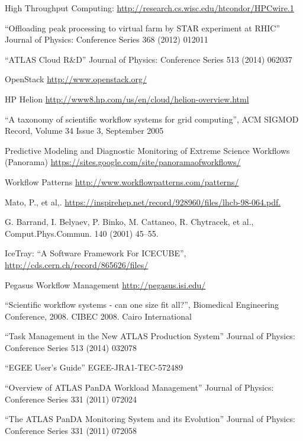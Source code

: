 \begin{thebibliography}{99}
 High Throughput Computing: \url{http://research.cs.wisc.edu/htcondor/HPCwire.1}

 ``Offloading peak processing to virtual farm by STAR experiment at RHIC'' Journal of Physics: Conference Series 368 (2012) 012011

 ``ATLAS Cloud R\&D'' Journal of Physics: Conference Series 513 (2014) 062037

 OpenStack \url{http://www.openstack.org/}

 HP Helion \url{http://www8.hp.com/us/en/cloud/helion-overview.html}

 ``A taxonomy of scientific workflow systems for grid computing'', ACM SIGMOD Record, Volume 34 Issue 3, September 2005

 Predictive Modeling and Diagnostic Monitoring of Extreme Science Workflows (Panorama) \url{https://sites.google.com/site/panoramaofworkflows/}

 Workflow Patterns \url{http://www.workflowpatterns.com/patterns/}

 Mato, P., et al,. \url{https://inspirehep.net/record/928960/files/lhcb-98-064.pdf.}

 G. Barrand, I. Belyaev, P. Binko, M. Cattaneo, R. Chytracek, et al., Comput.Phys.Commun. 140
(2001) 45–55.

 IceTray: ``A Software Framework For ICECUBE'', \url{http://cds.cern.ch/record/865626/files/}

 Pegasus Workflow Management \url{http://pegasus.isi.edu/}

 ``Scientific workflow systems - can one size fit all?'', Biomedical Engineering Conference, 2008. CIBEC 2008. Cairo International

 ``Task Management in the New ATLAS Production System'' Journal of Physics: Conference Series 513 (2014) 032078

 ``EGEE User’s Guide'' EGEE-JRA1-TEC-572489

 ``Overview of ATLAS PanDA Workload Management'' Journal of Physics: Conference Series 331 (2011) 072024

 ``The ATLAS PanDA Monitoring System and its Evolution'' Journal of Physics: Conference Series 331 (2011) 072058


\end{thebibliography}
